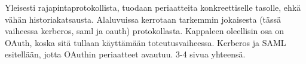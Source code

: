 Yleisesti rajapintaprotokollista, tuodaan periaatteita konkreettiselle tasolle, ehkä vähän historiakatsausta. Alaluvuissa kerrotaan tarkemmin jokaisesta (tässä vaiheessa kerberos, saml ja oauth) protokollasta. Kappaleen oleellisin osa on OAuth, koska sitä tullaan käyttämään toteutusvaiheessa. Kerberos ja SAML esitellään, jotta OAuthin periaatteet avautuu. 3-4 sivua yhteensä.
